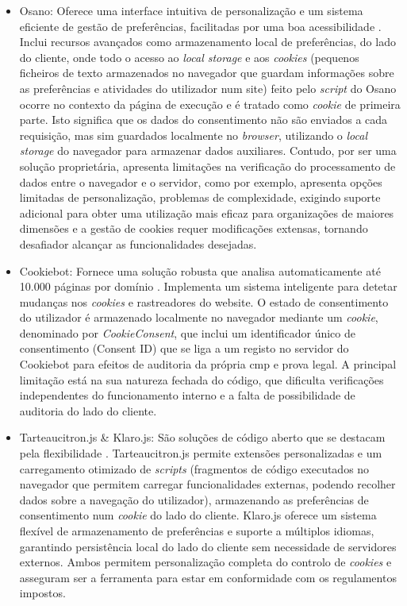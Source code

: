 \begin{itemize}
    \item Osano: Oferece uma interface intuitiva de personalização e um sistema eficiente de gestão de preferências, facilitadas por uma boa acessibilidade \cite{osano}. Inclui recursos avançados como armazenamento local de preferências, do lado do cliente, onde todo o acesso ao \textit{local storage} e aos \textit{cookies} (pequenos ficheiros de texto armazenados no navegador que guardam informações sobre as preferências e atividades do utilizador num site) feito pelo \textit{script} do Osano ocorre no contexto da página de execução e é tratado como \textit{cookie} de primeira parte. Isto significa que os dados do consentimento não são enviados a cada requisição, mas sim guardados localmente no \textit{browser}, utilizando o \textit{local storage} do navegador para armazenar dados auxiliares. Contudo, por ser uma solução proprietária, apresenta limitações na verificação do processamento de dados entre o navegador e o servidor, como por exemplo, apresenta opções limitadas de personalização, problemas de complexidade, exigindo suporte adicional para obter uma utilização mais eficaz para organizações de maiores dimensões e a gestão de cookies requer modificações extensas, tornando desafiador alcançar as funcionalidades desejadas.

    \item Cookiebot: Fornece uma solução robusta que analisa automaticamente até 10.000 páginas por domínio \cite{Cookiebot2024}. Implementa um sistema inteligente para detetar mudanças nos \textit{cookies} e rastreadores do website. O estado de consentimento do utilizador é armazenado localmente no navegador mediante um \textit{cookie}, denominado por \textit{CookieConsent}, que inclui um identificador único de consentimento (Consent ID) que se liga a um registo no servidor do Cookiebot para efeitos de auditoria da própria \acrshort{cmp} e prova legal. A principal limitação está na sua natureza fechada do código, que dificulta verificações independentes do funcionamento interno e a falta de possibilidade de auditoria do lado do cliente.

    \item Tarteaucitron.js \& Klaro.js: São soluções de código aberto que se destacam pela flexibilidade \cite{tarteaucitron}. Tarteaucitron.js permite extensões personalizadas e um carregamento otimizado de \textit{scripts} (fragmentos de código executados no navegador que permitem carregar funcionalidades externas, podendo recolher dados sobre a navegação do utilizador), armazenando as preferências de consentimento num \textit{cookie} do lado do cliente. Klaro.js oferece um sistema flexível de armazenamento de preferências e suporte a múltiplos idiomas, garantindo persistência local do lado do cliente sem necessidade de servidores externos. Ambos permitem personalização completa do controlo de \textit{cookies} e asseguram ser a ferramenta para estar em conformidade com os regulamentos impostos.


\end{itemize}

